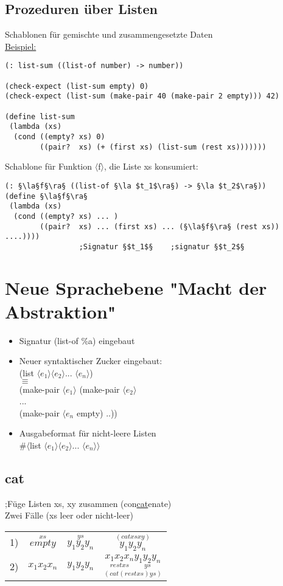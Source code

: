 \documentclass[a4paper,12pt]{article}
\newcommand{\la}{$\langle$}
\newcommand{\ra}{$\rangle$}
\begin{document}


\newpage

\subsection{Prozeduren über Listen}
Schablonen für gemischte und zusammengesetzte Daten\\
\uline{Beispiel:}
\begin{lstlisting}[style=customc]
(: list-sum ((list-of number) -> number))

(check-expect (list-sum empty) 0)
(check-expect (list-sum (make-pair 40 (make-pair 2 empty))) 42)

(define list-sum
 (lambda (xs)
  (cond ((empty? xs) 0)
        ((pair?  xs) (+ (first xs) (list-sum (rest xs)))))))
\end{lstlisting}
Schablone für Funktion \la f\ra, die Liste xs konsumiert:
\begin{lstlisting}[style=customc]
(: §\la§f§\ra§ ((list-of §\la $t_1$\ra§) -> §\la $t_2$\ra§))
(define §\la§f§\ra§
 (lambda (xs)
  (cond ((empty? xs) ... )
        ((pair?  xs) ... (first xs) ... (§\la§f§\ra§ (rest xs)) ....))))
		         ;Signatur §$t_1$§    ;signatur §$t_2$§
\end{lstlisting}

\section{Neue Sprachebene "Macht der Abstraktion"}
\begin{itemize}
\item Signatur (list-of \%a) eingebaut 
\item Neuer syntaktischer Zucker eingebaut: \\
 (list \la$e_1$\ra \la$e_2$\ra ... \la$e_n$\ra)\\
 $\equiv$\\
 (make-pair \la$e_1$\ra  
			 (make-pair \la$e_2$\ra\\
			 ...\\
			 (make-pair \la$e_n$ empty) ..))\\
\item Ausgabeformat für nicht-leere Listen \\
\#\la list \la$e_1$\ra \la$e_2$\ra ... \la$e_n$\ra\ra
\end{itemize}

\subsection{cat}
;Füge Listen xs, xy zusammen (con\uline{cat}enate)\\
Zwei Fälle (xs leer oder nicht-leer)\\
\begin{tabular}{lccc}
1) & $\overset{xs}{empty}$ & $\overset{ys}{y_1 y_2 y_n}$  & $\overset{(cat xs xy)}{y_1 y_2 y_n}$\\
2) &  $x_1 x_2 x_n$  &          $y_1 y_2 y_n$ &				$\underset{(cat (rest xs) ys)}{	\underset{rest xs}{x_1 x_2    x_n}    \underset{ys}{y_1 y_2   y_n}}$
\end{tabular}
\end{document}
